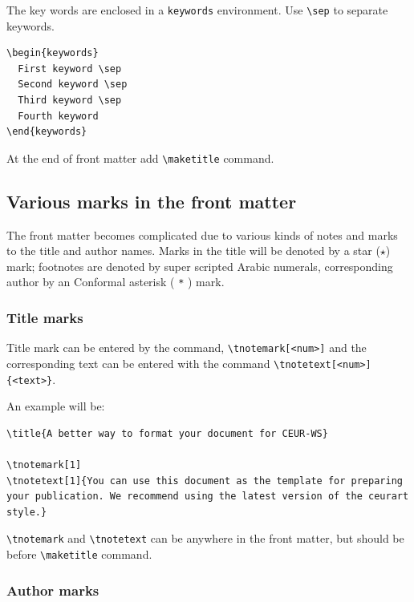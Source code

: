 \documentclass[%
]{ceurart}
\begin{document}
The key words are enclosed in a
\verb|keywords|
environment. Use
\verb|\sep|
 to separate keywords.

\begin{lstlisting}[language={[latex]TeX}]
\begin{keywords}
  First keyword \sep
  Second keyword \sep
  Third keyword \sep
  Fourth keyword
\end{keywords}
\end{lstlisting}

At the end of front matter add
\verb|\maketitle|
 command.

\subsection{Various marks in the front matter}

The front matter becomes complicated due to various kinds of notes and marks to the title and author names.
Marks in the title will be denoted by a star ($\star$) mark; footnotes are denoted by super scripted Arabic numerals, corresponding author by an Conformal asterisk (
\verb|*|
) mark.

\subsubsection{Title marks}

Title mark can be entered by the command,
\verb|\tnotemark[<num>]|
and the corresponding text can be entered with the command
\verb|\tnotetext[<num>]{<text>}|.

An example will be:
\begin{lstlisting}[language={[latex]TeX}]
\title{A better way to format your document for CEUR-WS}

\tnotemark[1]
\tnotetext[1]{You can use this document as the template for preparing your publication. We recommend using the latest version of the ceurart style.}
\end{lstlisting}

\verb|\tnotemark|
 and
\verb|\tnotetext|
 can be anywhere in the front matter, but should be before
\verb|\maketitle|
 command.

\subsubsection{Author marks}
\end{document}
